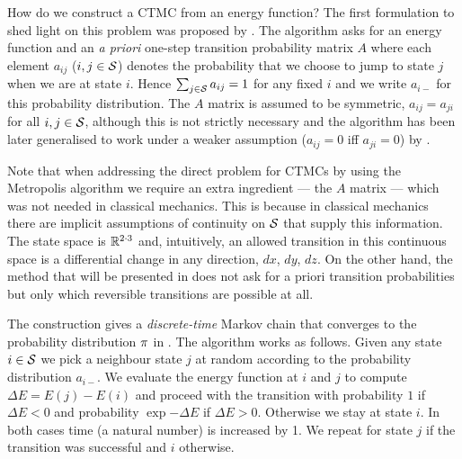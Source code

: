 How do we construct a CTMC
from an energy function?
The first formulation to shed light on this problem
was proposed by \citet{metropolis}.
The algorithm asks for an energy function and
an \emph{a priori} one-step transition probability matrix $A$
where each element $a_{ij}$ ($i,j \in \mathcal{S}$)
denotes the probability that
we choose to jump to state $j$ when we are at state $i$.
Hence $\sum_{j \in \mathcal{S}} a_{ij} = 1$ for any fixed $i$
and we write $a_{i-}$ for this probability distribution.
The $A$ matrix is assumed to be symmetric,
\ie $a_{ij} = a_{ji}$ for all $i,j \in \mathcal{S}$,
although this is not strictly necessary
and the algorithm has been later generalised
to work under a weaker assumption ($a_{ij} = 0$ iff $a_{ji} = 0$)
by \citet{hastings}.

Note that when addressing the direct problem for CTMCs
by using the Metropolis algorithm
we require an extra ingredient --- the $A$ matrix ---
which was not needed in classical mechanics.
This is because in classical mechanics there are
implicit assumptions of continuity on $\mathcal{S}$
that supply this information.
The state space is $\mathbb{R}^{2 \cdot 3}$
and, intuitively, an allowed transition in this continuous space
is a differential change in any direction,
\ie $dx$, $dy$, $dz$.
%
On the other hand,
the method that will be presented in 
does not ask for a priori transition probabilities
but only which reversible transitions are possible at all.

The construction gives a \emph{discrete-time} Markov chain that
converges to the probability distribution $\pi$ in .
The algorithm works as follows.
Given any state $i \in \mathcal{S}$ we pick a neighbour state $j$
at random according to the probability distribution $a_{i-}$.
We evaluate the energy function at $i$ and $j$
to compute $\Delta E = E(j)-E(i)$ and proceed with the transition
with probability $1$ if $\Delta E < 0$ and
probability $\exp{-\Delta E}$ if $\Delta E > 0$.
Otherwise we stay at state $i$.
In both cases time (a natural number) is increased by 1.
We repeat for state $j$ if the transition was successful
and $i$ otherwise.

